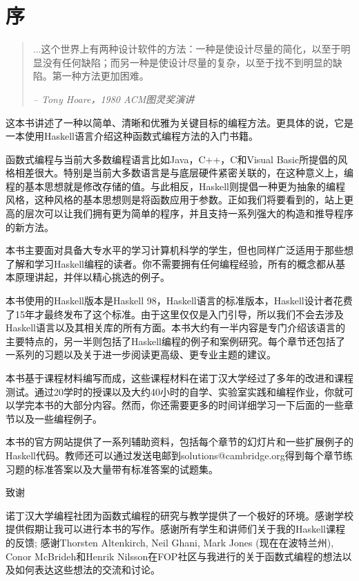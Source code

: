 \chapter*{序}
\begin{quotation}
...这个世界上有两种设计软件的方法：一种是使设计尽量的简化，以至于明显没有任何缺陷；而另一种是使设计尽量的复杂，以至于找不到明显的缺陷。第一种方法更加困难。
\begin{flushright}
\textit{ -- Tony Hoare，1980 ACM图灵奖演讲}
\end{flushright}
\end{quotation}
这本书讲述了一种以简单、清晰和优雅为关键目标的编程方法。更具体的说，它是一本使用Haskell语言介绍这种函数式编程方法的入门书籍。

函数式编程与当前大多数编程语言比如Java，C++，C和Visual
Basic所提倡的风格相差很大。特别是当前大多数语言是与底层硬件紧密关联的，在这种意义上，编程的基本思想就是修改存储的值。与此相反，Haskell则提倡一种更为抽象的编程风格，这种风格的基本思想则是将函数应用于参数。正如我们将要看到的，站上更高的层次可以让我们拥有更为简单的程序，并且支持一系列强大的构造和推导程序的新方法。

本书主要面对具备大专水平的学习计算机科学的学生，但也同样广泛适用于那些想了解和学习Haskell编程的读者。你不需要拥有任何编程经验，所有的概念都从基本原理讲起，并伴以精心挑选的例子。

本书使用的Haskell版本是Haskell
98，Haskell语言的标准版本，Haskell设计者花费了15年才最终发布了这个标准。由于这里仅仅是入门引导，所以我们不会去涉及
Haskell语言以及其相关库的所有方面。本书大约有一半内容是专门介绍该语言的主要特点的，另一半则包括了Haskell编程的例子和案例研究。每个章节还包括了一系列的习题以及关于进一步阅读更高级、更专业主题的建议。

本书基于课程材料编写而成，这些课程材料在诺丁汉大学经过了多年的改进和课程测试。通过20学时的授课以及大约40小时的自学、实验室实践和编程作业，你就可以学完本书的大部分内容。然而，你还需要更多的时间详细学习一下后面的一些章节以及一些编程例子。

本书的官方网站提供了一系列辅助资料，包括每个章节的幻灯片和一些扩展例子的Haskell代码。教师还可以通过发送电邮到solutions@cambridge.org得到每个章节练习题的标准答案以及大量带有标准答案的试题集。

\begin{flushleft}
致谢\\
\end{flushleft}

诺丁汉大学编程社团为函数式编程的研究与教学提供了一个极好的环境。感谢学校提供假期让我可以进行本书的写作。感谢所有学生和讲师们关于我的Haskell课程的反馈;
感谢Thorsten Altenkirch, Neil Ghani, Mark Jones (现在在波特兰州), Conor McBrideh和Henrik Nilsson在FOP社区与我进行的关于函数式编程的想法以及如何表达这些想法的交流和讨论。

